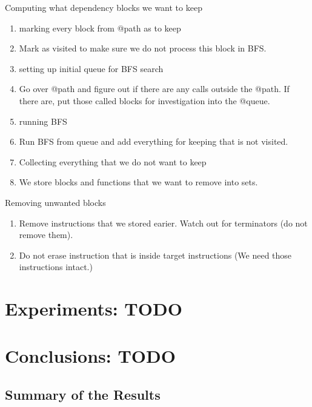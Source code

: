 \documentclass[12pt, twoside]{fithesis2}
\renewcommand{\_}{\leavevmode \kern0.07em\vbox{\hrule width0.4em}}
\newenvironment{myEnumerate}{
  \begin{enumerate}[
    leftmargin=2em,
    rightmargin=1em,
    itemsep=\parskip,
    parsep=0em,
    topsep=0em,
    partopsep=0em
]
}{
  \end{enumerate}
}
\begin{document}
Computing what dependency blocks we want to keep
\begin{myEnumerate}
\item marking every block from @path as to keep
\item Mark as visited to make sure we do not process this block in BFS.
\item setting up initial queue for BFS search
\item Go over @path and figure out if there are any calls outside the @path. If there
are, put those called blocks for investigation into the @queue.
\item running BFS
\item Run BFS from queue and add everything for keeping that is not visited.
\item Collecting everything that we do not want to keep
\item We store blocks and functions that we want to remove into sets.
\end{myEnumerate}

Removing unwanted blocks
\begin{myEnumerate}
\item Remove instructions that we stored earier. Watch out for terminators (do not
remove them).
\item Do not erase instruction that is inside target instructions (We need those
instructions intact.)
\end{myEnumerate}

\chapter{Experiments: TODO}
\label{chap:experiments}


\chapter{Conclusions: TODO}
\label{chap:conclusions}

\section{Summary of the Results}
\label{sec:conclusions-summary}

\end{document}
